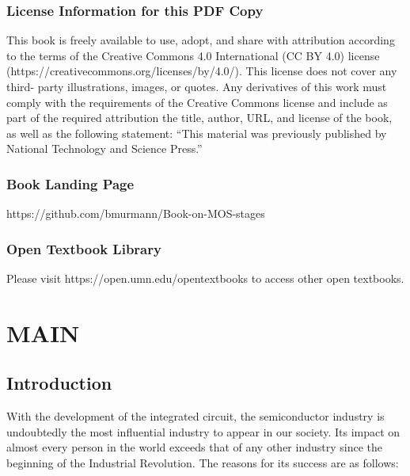 \documentclass[
  11pt,
  letterpaper,
  abstract]{scrbook}
\begin{document}
\section*{License Information for this PDF
Copy}\label{license-information-for-this-pdf-copy}


This book is freely available to use, adopt, and share with attribution
according to the terms of the Creative Commons 4.0 International (CC BY
4.0) license (https://creativecommons.org/licenses/by/4.0/). This
license does not cover any third- party illustrations, images, or
quotes. Any derivatives of this work must comply with the requirements
of the Creative Commons license and include as part of the required
attribution the title, author, URL, and license of the book, as well as
the following statement: ``This material was previously published by
National Technology and Science Press.''

\section*{Book Landing Page}\label{book-landing-page}


https://github.com/bmurmann/Book-on-MOS-stages

\section*{Open Textbook Library}\label{open-textbook-library}


Please visit https://open.umn.edu/opentextbooks to access other open
textbooks.

\part{MAIN}

\chapter{Introduction}\label{sec-introduction}

With the development of the integrated circuit, the semiconductor
industry is undoubtedly the most influential industry to appear in our
society. Its impact on almost every person in the world exceeds that of
any other industry since the beginning of the Industrial Revolution. The
reasons for its success are as follows:
\end{document}

